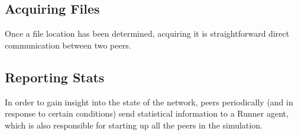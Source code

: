 \noindent{}

\subsection{Acquiring Files}

Once a file location has been determined, acquiring it is straightforward direct
communication between two peers.

\noindent{}

\subsection{Reporting Stats}

In order to gain insight into the state of the network, peers periodically (and
in response to certain conditions) send statistical information to a Runner
agent, which is also responsible for starting up all the peers in the
simulation.

\noindent{}

